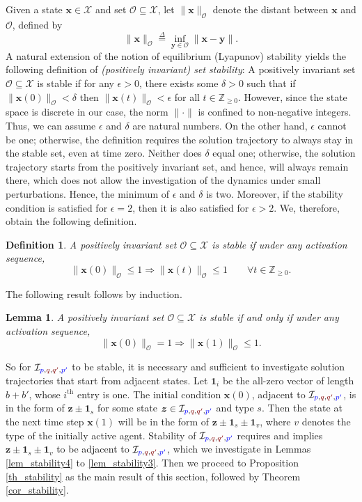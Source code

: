 \documentclass[10 pt,twocolumn,journal]{IEEEtran}
\newtheorem{definition}{Definition}
\theoremstyle{plain}
\newtheorem{lemma}{Lemma}
\newcommand{\db}{\overset{\Delta}{=}}
\renewcommand{\O}{\mathcal{O}}
\newcommand{\I}{\mathcal{I}}
\newcommand{\X}{\mathcal{X}}
\newcommand{\x}{\bm{x}}
\newcommand{\y}{\bm{y}}
\newcommand{\z}{\bm{z}}
\newcommand{\p}{\tb{p}}
\newcommand{\pp}{\tb{p'}}
\newcommand{\q}{\tr{q}}
\newcommand{\qq}{\tr{q'}}
\newcommand{\tb}{\textcolor{blue}}
\newcommand{\tr}{\textcolor{Myred}}
\theoremstyle{definition}
\begin{document}
Given a state $\x\in\X$ and set $\O\subseteq\X$, let $\|\x\|_\O$ denote the distant between $\x$ and $\O$, defined by 
$$
    \|\x\|_\O\db\inf_{\y\in\O}\|\x-\y\|.
$$
A natural extension of the notion of equilibrium (Lyapunov) stability yields the following definition of \emph{(positively invariant) set stability}: A positively invariant set $\O\subseteq\X$ is stable if for any $\epsilon>0$, there exists some $\delta>0$ such that if $\|\x(0)\|_\O <\delta$ then $\|\x(t)\|_\O <\epsilon$ for all $t\in\mathbb{Z}_{\geq0}$.
However, since the state space is discrete in our case, the norm $\|\cdot\|$ is confined to non-negative integers.
Thus, we can assume $\epsilon$ and $\delta$ are natural numbers. 
On the other hand, $\epsilon$ cannot be one; otherwise, the definition requires the solution trajectory to always stay in the stable set, even at time zero.
Neither does $\delta$ equal one; otherwise, the solution trajectory starts from the positively invariant set, and hence, will always remain there, which does not allow the investigation of the dynamics under small perturbations.   
Hence, the minimum of $\epsilon$ and $\delta$ is two. 
Moreover, if the stability condition is satisfied for $\epsilon = 2$, then it is also satisfied for $\epsilon > 2$. 
We, therefore, obtain the following definition.
\begin{definition}
    A positively invariant set $\O\subseteq\X$ is stable if under any activation sequence,
    \begin{equation*}
        \|\x(0)\|_\O  \leq 1 
        \Rightarrow
        \|\x(t)\|_\O  \leq 1 \qquad \forall t\in\mathbb{Z}_{\geq0}.
    \end{equation*}
\end{definition}
The following result follows by induction.
\begin{lemma}   \label{lem_stabilityDefinition}
    A positively invariant set $\O\subseteq\X$ is stable if and only if under any activation sequence,
    \begin{equation}        \label{stability_lemma1}
        \|\x(0)\|_\O  = 1 
        \Rightarrow
        \|\x(1)\|_\O  \leq 1.
    \end{equation}
\end{lemma}

So for $\I_{\p,\q,\qq,\pp}$ to be stable, it is necessary and sufficient to investigate solution trajectories that start from adjacent states. 
Let $\bm{1}_i$ be the all-zero vector of length $b+b'$, whose $i^{\text{th}}$ entry is one.
The initial condition $\x(0)$, adjacent to $\I_{\p,\q,\qq,\pp}$, is in the form of $\z\pm\bm{1}_s$ for some state $\z\in\I_{\p,\q,\qq,\pp}$ and type $s$. 
Then the state at the next time step $\x(1)$ will be in the form of $\z\pm\bm{1}_s\pm\bm{1}_v$, where $v$ denotes the type of the initially active agent. 
Stability of $\I_{\p,\q,\qq,\pp}$ requires and implies $\z\pm\bm{1}_s\pm\bm{1}_v$ to be adjacent to $\I_{\p,\q,\qq,\pp}$, which we investigate in Lemmas \ref{lem_stability4} to \ref{lem_stability3}. 
Then we proceed to Proposition \ref{th_stability} as the main result of this section, followed by Theorem \ref{cor_stability}.
\end{document}
